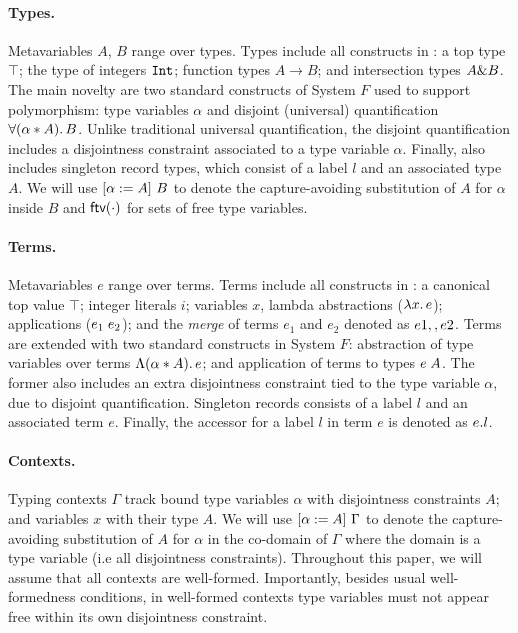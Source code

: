 
\paragraph{Types.} 
Metavariables $A$, $B$ range over types. 
Types include all constructs in \oldname: a top type $\top$; 
the type of integers $\tyint$;
function types $A \to B$; and intersection types $A \inter B$.
The main novelty are two standard constructs of System $F$ used to support
polymorphism: 
type variables $\alpha$ and disjoint (universal) quantification $\fordis \alpha A B$. 
Unlike traditional universal quantification, the disjoint
quantification includes a disjointness constraint associated to a type variable $\alpha$.
Finally, \name also includes singleton record types, which consist of a label $l$ and
an associated type $A$.
We will use $\subst {A} \alpha {B}$
to denote the capture-avoiding substitution of $A$ for $\alpha$ inside $B$ and
$\ftv \cdot$ for sets of free type variables. 

\paragraph{Terms.} 
Metavariables $e$ range over terms.  
Terms include all constructs in \oldname: a canonical top value $\top$; integer literals $i$;
variables $x$, lambda abstractions ($\lamty x A e$); applications 
($\app {e_1} {e_2}$); and the \emph{merge} of terms $e_1$ and $e_2 $ denoted as 
$e1 \mergeop e2$.
Terms are extended with two standard constructs in System $F$:
abstraction of type variables over terms $\blamdis \alpha A e$; and
application of terms to types $\tapp e A$. 
The former also includes an extra disjointness constraint tied to the type 
variable $\alpha$, due to disjoint quantification.
Singleton records consists of a label $l$ and an associated term $e$.
Finally, the accessor for a label $l$ in term $e$ is denoted as $\recordProj e l$.

\paragraph{Contexts.} Typing contexts $ \Gamma $ track bound type variables
$\alpha$ with disjointness constraints $A$; and variables $x$ with their type $A$. 
We will use $\subst {A} \alpha {\Gamma}$
to denote the capture-avoiding substitution of $A$ for $\alpha$ in the co-domain of
$\Gamma$ where the domain is a type variable (i.e all disjointness constraints).
Throughout this paper, we will assume that all contexts are
well-formed. Importantly, besides usual well-formedness conditions, in
well-formed contexts type variables must not appear free within its own disjointness constraint.
